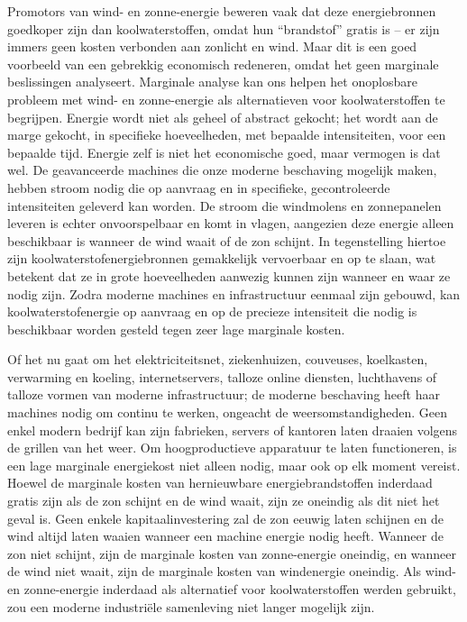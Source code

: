 Promotors van wind- en zonne-energie beweren vaak dat deze energiebronnen goedkoper zijn dan koolwaterstoffen, omdat hun ``brandstof''  gratis is -- er zijn immers geen kosten verbonden aan zonlicht en wind. Maar dit is een goed voorbeeld van een gebrekkig economisch redeneren, omdat het geen marginale beslissingen analyseert. Marginale analyse kan ons helpen het onoplosbare probleem met wind- en zonne-energie als alternatieven voor koolwaterstoffen te begrijpen. Energie wordt niet als geheel of abstract gekocht; het wordt aan de marge gekocht, in specifieke hoeveelheden, met bepaalde intensiteiten, voor een bepaalde tijd. Energie zelf is niet het economische goed, maar vermogen is dat wel. De geavanceerde machines die onze moderne beschaving mogelijk maken, hebben stroom nodig die op aanvraag en in specifieke, gecontroleerde intensiteiten geleverd kan worden. De stroom die windmolens en zonnepanelen leveren is echter onvoorspelbaar en komt in vlagen, aangezien deze energie alleen beschikbaar is wanneer de wind waait of de zon schijnt. In tegenstelling hiertoe zijn koolwaterstofenergiebronnen gemakkelijk vervoerbaar en op te slaan, wat betekent dat ze in grote hoeveelheden aanwezig kunnen zijn wanneer en waar ze nodig zijn. Zodra moderne machines en infrastructuur eenmaal zijn gebouwd, kan koolwaterstofenergie op aanvraag en op de precieze intensiteit die nodig is beschikbaar worden gesteld tegen zeer lage marginale kosten.

Of het nu gaat om het elektriciteitsnet, ziekenhuizen, couveuses, koelkasten, verwarming en koeling, internetservers, talloze online diensten, luchthavens of talloze vormen van moderne infrastructuur; de moderne beschaving heeft haar machines nodig om continu te werken, ongeacht de weersomstandigheden. Geen enkel modern bedrijf kan zijn fabrieken, servers of kantoren laten draaien volgens de grillen van het weer. Om hoogproductieve apparatuur te laten functioneren, is een lage marginale energiekost niet alleen nodig, maar ook op elk moment vereist. Hoewel de marginale kosten van hernieuwbare energiebrandstoffen inderdaad gratis zijn als de zon schijnt en de wind waait, zijn ze oneindig als dit niet het geval is. Geen enkele kapitaalinvestering zal de zon eeuwig laten schijnen en de wind altijd laten waaien wanneer een machine energie nodig heeft. Wanneer de zon niet schijnt, zijn de marginale kosten van zonne-energie oneindig, en wanneer de wind niet waait, zijn de marginale kosten van windenergie oneindig. Als wind- en zonne-energie inderdaad als alternatief voor koolwaterstoffen werden gebruikt, zou een moderne industriële samenleving niet langer mogelijk zijn.

